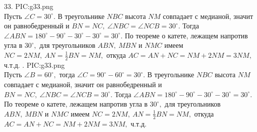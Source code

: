 33. {{PIC:g33.png}}\\
Пусть $\angle C=30^\circ.$ В треугольнике $NBC$ высота $NM$ совпадает с медианой, значит он равнобедренный и $BN=NC,\ \angle NBC=\angle NCB=30^\circ.$ Тогда $\angle ABN=180^\circ-90^\circ-30^\circ-30^\circ=30^\circ.$ По теореме о катете, лежащем напротив угла в $30^\circ,$ для треугольников $ABN,\ MBN$ и $NMC$ имеем $NC=2NM,\ AN=\frac{1}{2}BN=NM,$ откуда $AC=AN+NC=NM+2NM=3NM,$ ч.т.д.\newpage
{}. {{PIC:g33.png}}\\
Пусть $\angle B=60^\circ,$ тогда $\angle C=90^\circ-60^\circ=30^\circ.$ В треугольнике $NBC$ высота $NM$ совпадает с медианой, значит он равнобедренный и $BN=NC,\ \angle NBC=\angle NCB=30^\circ.$ Тогда $\angle ABN=180^\circ-90^\circ-30^\circ-30^\circ=30^\circ.$ По теореме о катете, лежащем напротив угла в $30^\circ,$ для треугольников $ABN,\ MBN$ и $NMC$ имеем $NC=2NM,\ AN=\frac{1}{2}BN=NM,$ откуда $AC=AN+NC=NM+2NM=3NM,$ ч.т.д.\\
